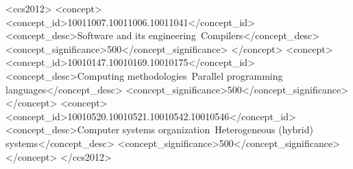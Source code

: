 \documentclass[acmtog,natbib=false]{acmart}
\newcommand{\code}[1]{\texttt{#1}\xspace}
\begin{document}
\begin{abstract}
Modern day supercomputers are massively parallel, heterogeneous systems, many of which employ \acp{GPU} to accelerate applications.
While C/C++, but also Python, gain traction in the \ac{HPC} domain, Fortran continues to have a large developer base with new high performance code written every day.
The OpenMP \ac{API} is a key ingredient to provide multi-threading and support for offloading execution to \acp{GPU} for \ac{HPC} applications.
AMD is developing the AMD Next Generation Fortran compiler that will eventually replace the existing AMD Fortran Compiler, which is based on the Classic Flang compiler.
This paper describes the general compilation pipeline of the AMD Next Generation Fortran Compiler.
It shows how the compiler generates code for OpenMP \code{target} directives and their \code{map} clauses.
The paper closes with a discussion of transformations in intermediate representation such as implementing \code{DO CONCURRENT} using OpenMP intermediate code.
\end{abstract}

\begin{CCSXML}
<ccs2012>
   <concept>
       <concept_id>10011007.10011006.10011041</concept_id>
       <concept_desc>Software and its engineering~Compilers</concept_desc>
       <concept_significance>500</concept_significance>
       </concept>
   <concept>
       <concept_id>10010147.10010169.10010175</concept_id>
       <concept_desc>Computing methodologies~Parallel programming languages</concept_desc>
       <concept_significance>500</concept_significance>
       </concept>
   <concept>
       <concept_id>10010520.10010521.10010542.10010546</concept_id>
       <concept_desc>Computer systems organization~Heterogeneous (hybrid) systems</concept_desc>
       <concept_significance>500</concept_significance>
       </concept>
 </ccs2012>
\end{CCSXML}



\maketitle
\end{document}
